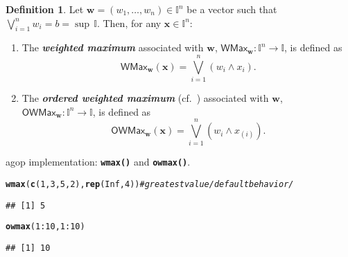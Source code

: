 \documentclass[11pt]{article}\usepackage[]{graphicx}\usepackage[]{color}
\makeatletter
\newcommand{\hlnum}[1]{\textcolor[rgb]{0.686,0.059,0.569}{#1}}%
\newcommand{\hlcom}[1]{\textcolor[rgb]{0.678,0.584,0.686}{\textit{#1}}}%
\newcommand{\hlopt}[1]{\textcolor[rgb]{0,0,0}{#1}}%
\newcommand{\hlstd}[1]{\textcolor[rgb]{0.345,0.345,0.345}{#1}}%
\newcommand{\hlkwd}[1]{\textcolor[rgb]{0.737,0.353,0.396}{\textbf{#1}}}%
\newenvironment{kframe}{%
 \def\at@end@of@kframe{}%
 \ifinner\ifhmode%
  \def\at@end@of@kframe{\end{minipage}}%
  \begin{minipage}{\columnwidth}%
 \fi\fi%
 \def\FrameCommand##1{\hskip\@totalleftmargin \hskip-\fboxsep
 \colorbox{shadecolor}{##1}\hskip-\fboxsep
     \hskip-\linewidth \hskip-\@totalleftmargin \hskip\columnwidth}%
 \MakeFramed {\advance\hsize-\width
   \@totalleftmargin\z@ \linewidth\hsize
   \@setminipage}}%
 {\par\unskip\endMakeFramed%
 \at@end@of@kframe}
\newenvironment{knitrout}{}{} %
\renewcommand{\emph}[1]{\textbf{\textsl{#1}}}
\newcommand{\package}[1]{\textsf{#1}\xspace}
\newcommand{\Rfunc}[1]{\texttt{\hlkwd{#1}}}
\newcommand{\vect}[1]{{\mathbf{#1}}}
\newcommand{\func}[1]{{\mathsf{#1}}}
\newcommand{\Ival}{\mathbb{I}}
\newcommand{\IvalPow}[1]{\mathbb{I}^{#1}}
\theoremstyle{remark}
\theoremstyle{definition}
\newtheorem{definition}[theorem]{Definition}
\makeatother
\begin{document}
\medskip
\begin{definition}
Let  $\vect{w}=(w_{1},\dots,w_{n})\in\IvalPow{n}$ be a vector such that
$\bigvee_{i=1}^{n}w_{i}=b=\sup\,\Ival$.
Then, for any $\vect{x}\in\IvalPow{n}$:
\begin{enumerate}
\item The \emph{weighted maximum} associated
with $\vect{w}$, $\func{WMax}_\vect{w}: \IvalPow{n}\to\Ival$,
 is defined as
\[\func{WMax}_\vect{w}(\vect{x})=\bigvee_{i=1}^{n}(w_{i}\wedge x_{i}).\]

\item The \emph{ordered weighted maximum}
(cf.~\cite{DuboisETAL1988:wfpm,DuboisPrade1996:owmin})
associated with $\vect{w}$,
$\func{OWMax}_\vect{w}: \IvalPow{n}\to\Ival$, is defined as
\[\func{OWMax}_\vect{w}(\vect{x})=\bigvee_{i=1}^{n}(w_{i}\wedge x_{(i)}).\]
\end{enumerate}
\end{definition}

\noindent
\package{agop} implementation: \index{\Rfunc{wmax()}}\Rfunc{wmax()}
and \index{\Rfunc{owmax()}}\Rfunc{owmax()}.

\begin{knitrout}\small
{}\color{fgcolor}\begin{kframe}
\begin{alltt}
\hlkwd{wmax}\hlstd{(}\hlkwd{c}\hlstd{(}\hlnum{1}\hlstd{,}\hlnum{3}\hlstd{,}\hlnum{5}\hlstd{,}\hlnum{2}\hlstd{),} \hlkwd{rep}\hlstd{(}\hlnum{Inf}\hlstd{,} \hlnum{4}\hlstd{))} \hlcom{# greatest value /default behavior/}
\end{alltt}
\begin{verbatim}
## [1] 5
\end{verbatim}
\begin{alltt}
\hlkwd{owmax}\hlstd{(}\hlnum{1}\hlopt{:}\hlnum{10}\hlstd{,} \hlnum{1}\hlopt{:}\hlnum{10}\hlstd{)}
\end{alltt}
\begin{verbatim}
## [1] 10
\end{verbatim}
\end{kframe}
\end{knitrout}
\end{document}
